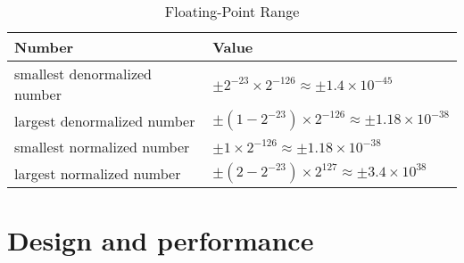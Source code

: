 \begin{table}[H]
\centering
\caption{Floating-Point Range}
\label{floating-point-range}
\begin{tabu} to \textwidth {XX}
\toprule
Number &Value\\
\hline
smallest denormalized number &$\pm 2^{-23} \times 2^{-126} \approx \pm 1.4 \times 10^{-45}$\\
\hline
largest denormalized number &$\pm (1-2^{-23}) \times 2^{-126} \approx \pm 1.18 \times 10^{-38}$\\
\hline
smallest normalized number &$\pm 1 \times 2^{-126} \approx \pm 1.18 \times 10^{-38}$\\
\hline
largest normalized number &$\pm (2-2^{-23}) \times 2^{127} \approx \pm 3.4 \times 10^{38}$\\
\bottomrule
\end{tabu}
\end{table}


\section{Design and performance}

